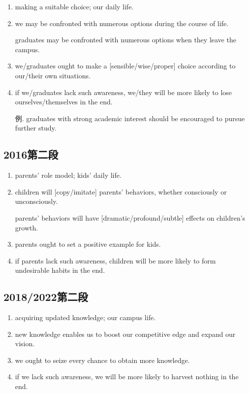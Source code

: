 \begin{enumerate}
    \item making a suitable choice; our daily life.
    \item we may be confronted with numerous options during the 
    course of life. 
    
    graduates may be confronted with numerous options when they leave the campus.
    \item we/graduates ought to make a [sensible/wise/proper]
    choice according to our/their own situations.
    \item if we/graduates lack such awareness, we/they will be more likely to lose
    ourselves/themselves in the end.
    \item[例.] graduates with strong academic interest should be encouraged to pursue 
    further study.
\end{enumerate}

\subsection{2016第二段}

\begin{enumerate}
    \item parents' role model; kids' daily life.
    \item children will [copy/imitate] parents' behaviors, whether 
    consciously or unconsciously.

    parents' behaviors will have [dramatic/profound/subtle]
    effects on children's growth.
    \item parents ought to set a positive example for kids.
    \item if parents lack such awareness, children will be more likely to 
    form undesirable habits in the end.
\end{enumerate}

\subsection{2018/2022第二段}

\begin{enumerate}
    \item acquiring updated knowledge; our campus life.
    \item new knowledge enables us to boost our competitive edge and 
    expand our vision.
    \item we ought to seize every chance to obtain more knowledge.
    \item if we lack such awareness, we will be more likely to harvest nothing in the end.
\end{enumerate}

